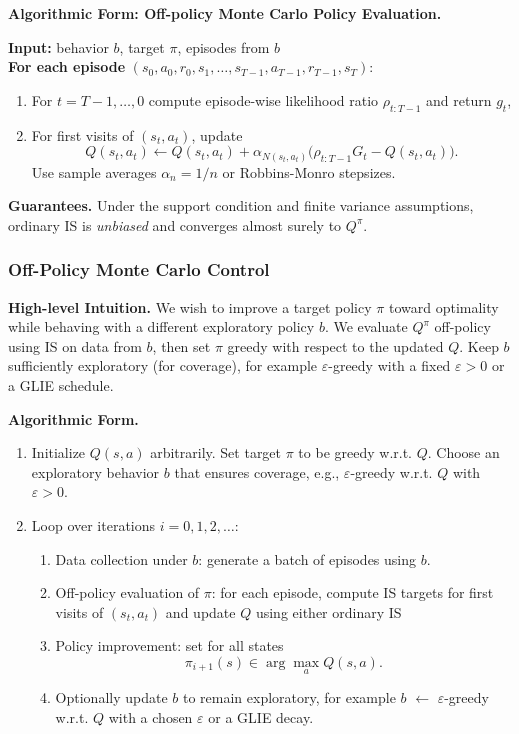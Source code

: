 \documentclass[
]{book}
\providecommand{\tightlist}{%
  \setlength{\itemsep}{0pt}\setlength{\parskip}{0pt}}
\theoremstyle{definition}
\theoremstyle{definition}
\theoremstyle{definition}
\theoremstyle{definition}
\theoremstyle{remark}
\begin{document}
\textbf{Algorithmic Form: Off-policy Monte Carlo Policy Evaluation.}

\textbf{Input:} behavior \(b\), target \(\pi\), episodes from \(b\)\\
\textbf{For each episode} \((s_0,a_0,r_0,s_1,\dots,s_{T-1},a_{T-1},r_{T-1},s_T)\):

\begin{enumerate}
\def\labelenumi{\arabic{enumi}.}
\item
  For \(t=T-1,\dots,0\) compute episode-wise likelihood ratio \(\rho_{t:T-1}\) and return \(g_t\),
\item
  For first visits of \((s_t,a_t)\), update
  \[
  Q(s_t,a_t) \leftarrow Q(s_t,a_t) + \alpha_{N(s_t,a_t)}\big(\rho_{t:T-1} G_t - Q(s_t,a_t)\big).
  \]
  Use sample averages \(\alpha_n=1/n\) or Robbins-Monro stepsizes.
\end{enumerate}

\textbf{Guarantees.} Under the support condition and finite variance assumptions, ordinary IS is \emph{unbiased} and converges almost surely to \(Q^\pi\).

\subsubsection{Off-Policy Monte Carlo Control}\label{off-policy-monte-carlo-control}

\textbf{High-level Intuition.} We wish to improve a target policy \(\pi\) toward optimality while behaving with a different exploratory policy \(b\). We evaluate \(Q^\pi\) off-policy using IS on data from \(b\), then set \(\pi\) greedy with respect to the updated \(Q\). Keep \(b\) sufficiently exploratory (for coverage), for example \(\varepsilon\)-greedy with a fixed \(\varepsilon>0\) or a GLIE schedule.

\textbf{Algorithmic Form.}

\begin{enumerate}
\def\labelenumi{\arabic{enumi}.}
\item
  Initialize \(Q(s,a)\) arbitrarily. Set target \(\pi\) to be greedy w.r.t. \(Q\). Choose an exploratory behavior \(b\) that ensures coverage, e.g., \(\varepsilon\)-greedy w.r.t. \(Q\) with \(\varepsilon>0\).
\item
  Loop over iterations \(i=0,1,2,\dots\):

  \begin{enumerate}
  \def\labelenumii{\arabic{enumii}.}
  \tightlist
  \item
    Data collection under \(b\): generate a batch of episodes using \(b\).
  \item
    Off-policy evaluation of \(\pi\): for each episode, compute IS targets for first visits of \((s_t,a_t)\) and update \(Q\) using either ordinary IS
  \item
    Policy improvement: set for all states
    \[
    \pi_{i+1}(s) \in \arg\max_{a} Q(s,a).
    \]
  \item
    Optionally update \(b\) to remain exploratory, for example \(b\) \(\leftarrow\) \(\varepsilon\)-greedy w.r.t. \(Q\) with a chosen \(\varepsilon\) or a GLIE decay.
  \end{enumerate}
\end{enumerate}
\end{document}
